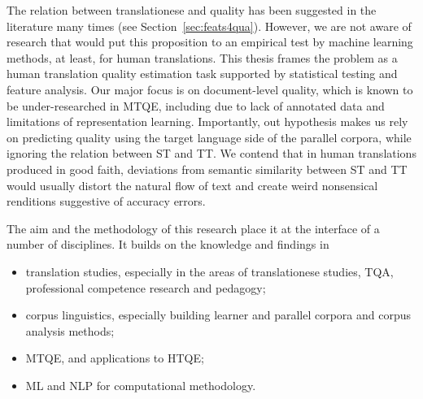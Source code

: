 The relation between translationese and quality has been suggested in the literature many times (see Section~\ref{sec:feats4qua}). However, we are not aware of research that would put this proposition to an empirical test by machine learning methods, at least, for human translations. This thesis frames the problem as a human translation quality estimation task supported by statistical testing and feature analysis. Our major focus is on document-level quality, which is known to be under-researched in MTQE, including due to lack of annotated data and limitations of representation learning. Importantly, out hypothesis makes us rely on predicting quality using the target language side of the parallel corpora, while ignoring the relation between ST and TT. We contend that in human translations produced in good faith, deviations from semantic similarity between ST and TT would usually distort the natural flow of text and create weird nonsensical renditions suggestive of accuracy errors. 

The aim and the methodology of this research place it at the interface of a number of disciplines. It builds on the knowledge and findings in 
\begin{itemize}\compresslist{}
	\item translation studies, especially in the areas of translationese studies, \gls{TQA}, professional competence research and pedagogy;
	\item corpus linguistics, especially building learner and parallel corpora and corpus analysis methods; 
	\item \gls{MTQE}, and applications to HTQE;
	\item \gls{ML} and \gls{NLP} for computational methodology.
\end{itemize}

